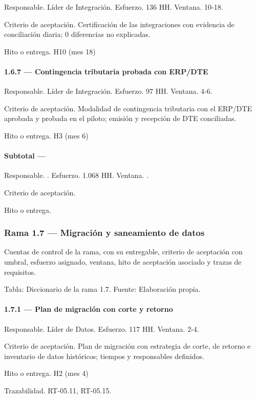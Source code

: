 \documentclass[11pt]{article}
\begin{document}
Responsable. Líder de Integración. Esfuerzo. 136 HH. Ventana. 10-18.

Criterio de aceptación. Certificación de las integraciones con evidencia de conciliación diaria; 0 diferencias no explicadas.

Hito o entrega. H10 (mes 18)

\paragraph{1.6.7 — Contingencia tributaria probada con ERP/DTE}

Responsable. Líder de Integración. Esfuerzo. 97 HH. Ventana. 4-6.

Criterio de aceptación. Modalidad de contingencia tributaria con el ERP/DTE aprobada y probada en el piloto; emisión y recepción de DTE conciliadas.

Hito o entrega. H3 (mes 6)

\paragraph{Subtotal — }

Responsable. . Esfuerzo. 1.068 HH. Ventana. .

Criterio de aceptación.

Hito o entrega.

\subsubsection{Rama 1.7 — Migración y saneamiento de datos}

Cuentas de control de la rama, con su entregable, criterio de aceptación con umbral, esfuerzo asignado, ventana, hito de aceptación asociado y trazas de requisitos.

Tabla: Diccionario de la rama 1.7. Fuente: Elaboración propia.

\paragraph{1.7.1 — Plan de migración con corte y retorno}

Responsable. Líder de Datos. Esfuerzo. 117 HH. Ventana. 2-4.

Criterio de aceptación. Plan de migración con estrategia de corte, de retorno e inventario de datos históricos; tiempos y responsables definidos.

Hito o entrega. H2 (mes 4)

Trazabilidad. RT-05.11, RT-05.15.
\end{document}
